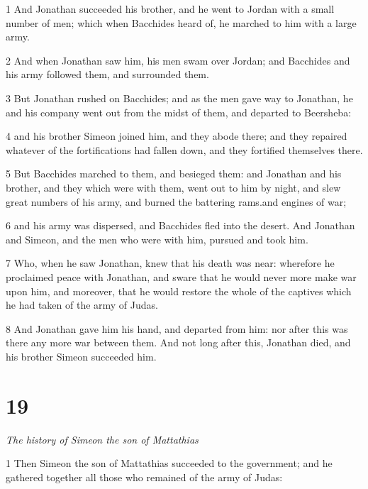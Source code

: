 \par 1 And Jonathan succeeded his brother, and he went to Jordan with a small number of men; which when Bacchides heard of, he marched to him with a large army. 

\par 2 And when Jonathan saw him, his men swam over Jordan; and Bacchides and his army followed them, and surrounded them. 

\par 3 But Jonathan rushed on Bacchides; and as the men gave way to Jonathan, he and his company went out from the midst of them, and departed to Beersheba: 

\par 4 and his brother Simeon joined him, and they abode there; and they repaired whatever of the fortifications had fallen down, and they fortified themselves there.

\par 5 But Bacchides marched to them, and besieged them: and Jonathan and his brother, and they which were with them, went out to him by night, and slew great numbers of his army, and burned the battering rams.and engines of war; 

\par 6 and his army was dispersed, and Bacchides fled into the desert. And Jonathan and Simeon, and the men who were with him, pursued and took him. 

\par 7 Who, when he saw Jonathan, knew that his death was near: wherefore he proclaimed peace with Jonathan, and sware that he would never more make war upon him, and moreover, that he would restore the whole of the captives which he had taken of the army of Judas. 

\par 8 And Jonathan gave him his hand, and departed from him: nor after this was there any more war between them. And not long after this, Jonathan died, and his brother Simeon succeeded him. 


\chapter{19}

\par \textit{The history of Simeon the son of Mattathias}

\par 1 Then Simeon the son of Mattathias succeeded to the government; and he gathered together all those who remained of the army of Judas: 

